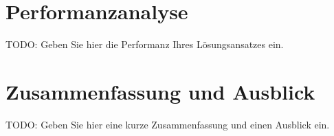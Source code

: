 \documentclass[course=erap]{aspdoc}
\begin{document}
\section{Performanzanalyse}

TODO: Geben Sie hier die Performanz Ihres Lösungsansatzes ein.

\section{Zusammenfassung und Ausblick}

TODO: Geben Sie hier eine kurze Zusammenfassung und einen Ausblick ein.



\end{document}
